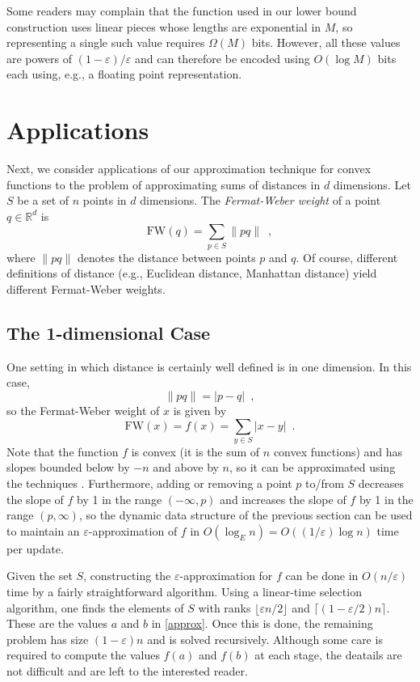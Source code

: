 \documentclass[charterfonts,lotsofwhite]{patmorin}
\newcommand{\fw}{\mathrm{FW}}
\newcommand{\eps}{\varepsilon}
\newcommand{\Real}{\mathbb{R}}
\begin{document}
\begin{rem}
Some readers may complain that the function used in our lower bound
construction uses linear pieces whose lengths are exponential in $M$,
so representing a single such value requires $\Omega(M)$ bits.
However, all these values are powers of $(1-\eps)/\eps$ and can
therefore be encoded using $O(\log M)$ bits each using, e.g., a
floating point representation.
\end{rem}

\section{Applications}

Next, we consider applications of our approximation technique for
convex functions to the problem of approximating sums of distances in
$d$ dimensions.  Let $S$ be a set of $n$ points in $d$ dimensions.
The \emph{Fermat-Weber weight} of a point $q\in\Real^d$ is
\[
   \fw(q) = \sum_{p\in S} \|pq\| \enspace ,
\]
where $\|pq\|$ denotes the distance between points $p$ and $q$. Of
course, different definitions of distance (e.g., Euclidean distance,
Manhattan distance) yield different Fermat-Weber weights.

\subsection{The 1-dimensional Case}

One setting in which distance is certainly well defined is in one
dimension.  In this case,
\[ 
\|pq\| = |p-q| \enspace ,
\]
so the Fermat-Weber weight of $x$ is given by
\[
   \fw(x) = f(x) = \sum_{y\in S} |x-y|  \enspace .
\]
Note that the function $f$ is convex (it is the sum of $n$ convex
functions) and has slopes bounded below by $-n$ and above by $n$, so
it can be approximated using the techniques .  Furthermore,
adding or removing a point $p$ to/from $S$ decreases the slope of $f$
by 1 in the range $(-\infty,p)$ and increases the slope of $f$ by 1 in
the range $(p,\infty)$, so the dynamic data structure of the previous
section can be used to maintain an $\eps$-approximation of $f$ in
$O(\log_E n)= O((1/\eps) \log n)$ time per update.

Given the set $S$, constructing the $\eps$-approximation for $f$
can be done in $O(n/\eps)$ time by a fairly straightforward
algorithm.  Using a linear-time selection algorithm, one finds the
elements of $S$ with ranks $\lfloor\eps n/2\rfloor$ and
$\lceil(1-\eps/2) n\rceil$.  These are the values $a$ and $b$ in
\eqref{approx}.  Once this is done, the remaining problem has size
$(1-\eps) n$ and is solved recursively.  Although some care is
required to compute the values $f(a)$ and $f(b)$ at each stage, the
deatails are not difficult and are left to the interested reader.
\end{document}
